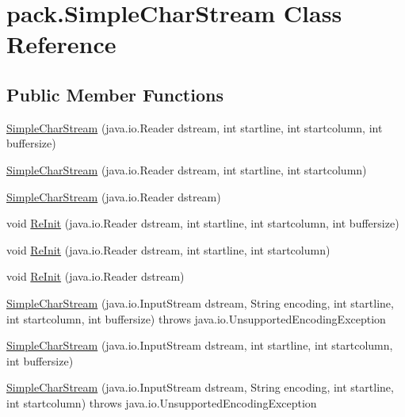 \hypertarget{classpack_1_1_simple_char_stream}{}\section{pack.\+Simple\+Char\+Stream Class Reference}
\label{classpack_1_1_simple_char_stream}
\subsection*{Public Member Functions}
\begin{DoxyCompactItemize}
\item 
\hyperlink{classpack_1_1_simple_char_stream_ae8fb1968a638939b6f842387397acaa0}{Simple\+Char\+Stream} (java.\+io.\+Reader dstream, int startline, int startcolumn, int buffersize)
\item 
\hyperlink{classpack_1_1_simple_char_stream_a4f389053106e2da7ce3c532835130485}{Simple\+Char\+Stream} (java.\+io.\+Reader dstream, int startline, int startcolumn)
\item 
\hyperlink{classpack_1_1_simple_char_stream_a3d69672afd996cf839cfcfcf343dd97e}{Simple\+Char\+Stream} (java.\+io.\+Reader dstream)
\item 
void \hyperlink{classpack_1_1_simple_char_stream_ab065c582586f975c6dcdf17d68bf314f}{Re\+Init} (java.\+io.\+Reader dstream, int startline, int startcolumn, int buffersize)
\item 
void \hyperlink{classpack_1_1_simple_char_stream_a08c88e054c6d98156580bca6fcdc00f3}{Re\+Init} (java.\+io.\+Reader dstream, int startline, int startcolumn)
\item 
void \hyperlink{classpack_1_1_simple_char_stream_a3fa3e56718ebd5f6a044d94fac293242}{Re\+Init} (java.\+io.\+Reader dstream)
\item 
\hyperlink{classpack_1_1_simple_char_stream_ad150151271e9e36f0ead6630682bee2f}{Simple\+Char\+Stream} (java.\+io.\+Input\+Stream dstream, String encoding, int startline, int startcolumn, int buffersize)  throws java.\+io.\+Unsupported\+Encoding\+Exception   
\item 
\hyperlink{classpack_1_1_simple_char_stream_ab0abf44eb929df981df103115e4e1d5a}{Simple\+Char\+Stream} (java.\+io.\+Input\+Stream dstream, int startline, int startcolumn, int buffersize)
\item 
\hyperlink{classpack_1_1_simple_char_stream_a5739934346f3293a0ac39c4c92f7e1c7}{Simple\+Char\+Stream} (java.\+io.\+Input\+Stream dstream, String encoding, int startline, int startcolumn)  throws java.\+io.\+Unsupported\+Encoding\+Exception   

\end{DoxyCompactItemize}
